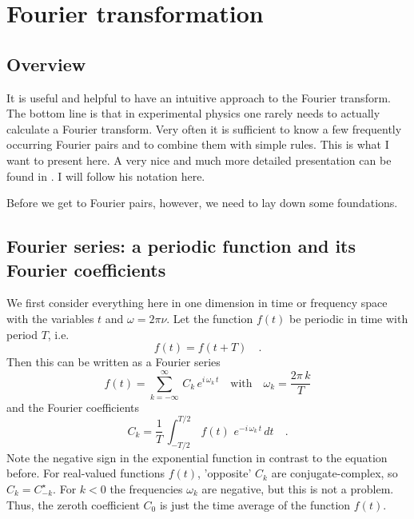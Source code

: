 \renewcommand{\lastmod}{October 23, 2026}
\renewcommand{\chapterauthors}{Markus Lippitz}

\chapter{Fourier transformation}

\section{Overview}

It is useful and helpful to have an intuitive approach to the Fourier transform. The bottom line is that in experimental physics one rarely needs to actually calculate a Fourier transform. Very often it is sufficient to know a few frequently occurring Fourier pairs and to combine them with simple rules. This is what I want to present here. A very nice and much more detailed presentation can be found in \cite{Butz2015}. I will follow his notation here.

Before we get to Fourier pairs, however, we need to lay down some foundations.

\section{Fourier series: a periodic function and its Fourier coefficients}

We first consider everything here in one dimension in time or frequency space with the variables $t$ and $\omega = 2 \pi \nu$. Let the function $f(t)$ be periodic in time with period $T$, i.e. 
\begin{equation}
 f(t) = f (t + T) \quad .
\end{equation}
Then this can be written as a Fourier series
\begin{equation}
 f(t) = \sum_{k=-\infty}^{\infty} \, C_k \, e^{i \, \omega_k \, t}
 \quad \text{with} \quad \omega_k = \frac{2 \pi \, k}{T}
\end{equation}
and the Fourier coefficients
\begin{equation}
 C_k = \frac{1}{T} \, \int_{-T/2}^{T/2} \, f(t) \, \, e^{-i \, \omega_k \, t} \, dt \quad .
\end{equation}
Note the negative sign in the exponential function in contrast to the equation before. For real-valued functions $f(t)$, 'opposite' $C_k$ are conjugate-complex, so $C_k = C_{-k}^\star$. For $k<0$ the frequencies $\omega_k$ are negative, but this is not a problem. Thus, the zeroth coefficient $C_0$ is just the time average of the function $f(t)$.



